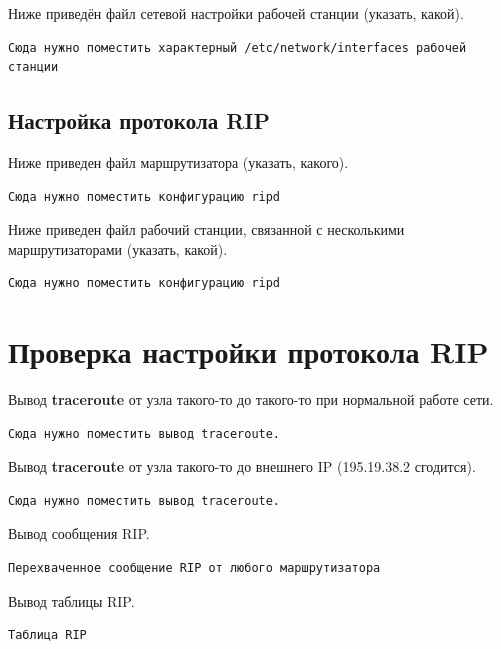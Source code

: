 \documentclass[a4paper,12pt]{article}
\begin{document}
Ниже приведён файл сетевой настройки рабочей станции (указать, какой).

\begin{Verbatim}
Сюда нужно поместить характерный /etc/network/interfaces рабочей станции
\end{Verbatim}



\subsection{Настройка протокола RIP}

Ниже приведен файл  маршрутизатора (указать, какого).

\begin{Verbatim}
Сюда нужно поместить конфигурацию ripd
\end{Verbatim}


Ниже приведен файл  рабочий станции, связанной с несколькими маршрутизаторами (указать, какой).

\begin{Verbatim}
Сюда нужно поместить конфигурацию ripd
\end{Verbatim}


\section{Проверка настройки протокола RIP}

Вывод \textbf{traceroute} от узла такого-то до такого-то при нормальной работе сети.

\begin{Verbatim}
Сюда нужно поместить вывод traceroute.
\end{Verbatim}

Вывод \textbf{traceroute} от узла такого-то до внешнего IP (195.19.38.2 сгодится).

\begin{Verbatim}
Сюда нужно поместить вывод traceroute.
\end{Verbatim}

Вывод сообщения RIP.

\begin{Verbatim}
Перехваченное сообщение RIP от любого маршрутизатора
\end{Verbatim}

Вывод таблицы RIP.

\begin{Verbatim}
Таблица RIP
\end{Verbatim}
\end{document}
